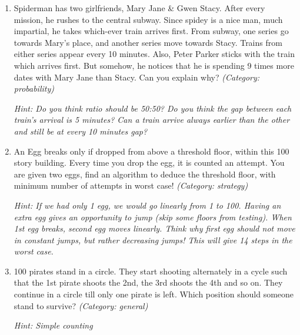 \begin{enumerate}
\item Spiderman has two girlfriends, Mary Jane \& Gwen Stacy. After every mission, he rushes to the central subway. Since spidey is a nice man, much impartial, he takes which-ever train arrives first. From subway, one series go towards Mary's place, and another series move towards Stacy. Trains from either series appear every 10 minutes. Also, Peter Parker sticks with the train which arrives first.
But somehow, he notices that he is spending 9 times more dates with Mary Jane than Stacy. Can you explain why?
\small\emph{(Category: probability)}

\small\emph{Hint: Do you think ratio should be 50:50? Do you think the gap between each train's arrival is 5 minutes? Can a train arrive always earlier than the other and still be at every 10 minutes gap?}





\item An Egg breaks only if dropped from above a threshold floor, within this 100 story building. Every time you drop the egg, it is counted an attempt. You are given two eggs, find an algorithm to deduce the threshold floor, with minimum number of attempts in worst case!
\small\emph{(Category: strategy)}

\small\emph{Hint: If we had only 1 egg, we would go linearly from 1 to 100. Having an extra egg gives an opportunity to jump (skip some floors from testing). When 1st egg breaks, second egg moves linearly. Think why first egg should not move in constant jumps, but rather decreasing jumps! This will give 14 steps in the worst case.}





\item 100 pirates stand in a circle. They start shooting alternately in a cycle such that the 1st pirate shoots the 2nd, the 3rd shoots the 4th and so on. They continue in a circle till only one pirate is left. Which position should someone stand to survive?
\small\emph{(Category: general)}

\small\emph{Hint: Simple counting}


\end{enumerate}
